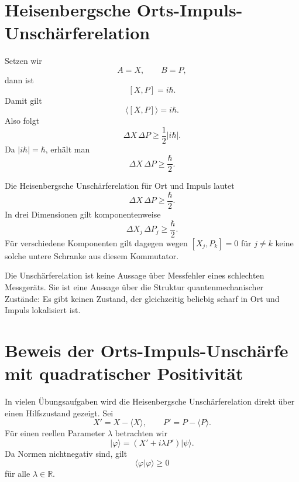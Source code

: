 \section{Heisenbergsche Orts-Impuls-Unschärferelation}

Setzen wir
\[
    A=X,
    \qquad
    B=P,
\]
dann ist
\[
    [X,P]=i\hbar.
\]
Damit gilt
\[
    \langle[X,P]\rangle=i\hbar.
\]
Also folgt
\[
    \Delta X\,\Delta P
    \ge
    \frac12|i\hbar|.
\]
Da $|i\hbar|=\hbar$, erhält man
\[
    \Delta X\,\Delta P\ge\frac{\hbar}{2}.
\]

\begin{formulabox}
Die Heisenbergsche Unschärferelation für Ort und Impuls lautet
\[
    \Delta X\,\Delta P\ge\frac{\hbar}{2}.
\]
In drei Dimensionen gilt komponentenweise
\[
    \Delta X_j\,\Delta P_j\ge\frac{\hbar}{2}.
\]
Für verschiedene Komponenten gilt dagegen wegen $[X_j,P_k]=0$ für $j\ne k$ keine solche untere Schranke aus diesem Kommutator.
\end{formulabox}

\begin{conceptbox}
Die Unschärferelation ist keine Aussage über Messfehler eines schlechten Messgeräts. Sie ist eine Aussage über die Struktur quantenmechanischer Zustände: Es gibt keinen Zustand, der gleichzeitig beliebig scharf in Ort und Impuls lokalisiert ist.
\end{conceptbox}

\section{Beweis der Orts-Impuls-Unschärfe mit quadratischer Positivität}

In vielen Übungsaufgaben wird die Heisenbergsche Unschärferelation direkt über einen Hilfszustand gezeigt. Sei
\[
    X'=X-\langle X\rangle,
    \qquad
    P'=P-\langle P\rangle.
\]
Für einen reellen Parameter $\lambda$ betrachten wir
\[
    |\varphi\rangle=(X'+i\lambda P')|\psi\rangle.
\]
Da Normen nichtnegativ sind, gilt
\[
    \langle\varphi|\varphi\rangle\ge0
\]
für alle $\lambda\in\mathbb R$.

